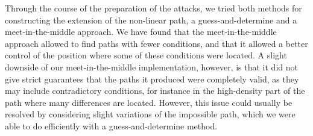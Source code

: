 Through the course of the preparation of the attacks, we tried both methods for constructing the extension of the non-linear path, \ie a guess-and-determine and a meet-in-the-middle approach.
We have found that the meet-in-the-middle approach allowed to find paths with fewer conditions, and that it allowed a better control of the position where some of these conditions were located.
A slight downside of our meet-in-the-middle implementation, however, is that it did not give strict guarantees that the paths it produced were completely valid, as they may include contradictory conditions,
for instance in the high-density part of the path where many differences are located. However, this issue could usually be resolved by considering slight variations of the impossible path, which
we were able to do efficiently with a guess-and-determine method.

\medskip

